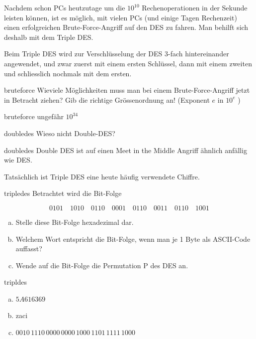 \documentclass[%
<<<<<<< Updated upstream
11pt,%
twoside,%
titlepage,%
german,%
headsepline%
]{scrartcl}
\begin{document}
\begin{cdef}[Linksverschiebung]{}
\begin{cdef}{}
\begin{ueb}
\begin{enumeratea}
Nachdem schon PCs heutzutage um die $10^{10}$ Rechenoperationen in der Sekunde leisten k\"onnen, ist es möglich, mit vielen PCs (und einige Tagen Rechenzeit) einen erfolgreichen Brute-Force-Angriff auf den DES zu fahren. Man behilft sich deshalb mit dem Triple DES.

Beim Triple DES wird zur Verschlüsselung der DES 3-fach hintereinander angewendet, und zwar zuerst mit einem ersten Schlüssel, dann mit einem zweiten und schliesslich nochmals mit dem ersten.

\begin{uebenv}{bruteforce}
Wieviele Möglichkeiten muss man bei einem Brute-Force-Angriff jetzt in Betracht ziehen? 
Gib die richtige Gr\"ossenordnung an! (Exponent $e$ in $10^e$ )
\end{uebenv}

\begin{lsg}{bruteforce}
    ungefähr $10^{34}$
\end{lsg}

\begin{uebenv}{doubledes}
Wieso nicht Double-DES?
\end{uebenv}

\begin{lsg}{doubledes}
    Double DES ist auf einen Meet in the Middle Angriff ähnlich anfällig wie DES.
\end{lsg}

Tatsächlich ist Triple DES eine heute häufig verwendete Chiffre.

\begin{uebenv}{tripledes}
Betrachtet wird die Bit-Folge

$$0101\quad 1010\quad 0110\quad 0001\quad 0110\quad 0011\quad 0110\quad 1001$$

\begin{enumerate}[a)]
\item Stelle diese Bit-Folge hexadezimal dar. 
\item Welchem Wort entspricht die Bit-Folge, wenn man je 1 Byte als ASCII-Code auffasst? 
\item Wende auf die Bit-Folge die  Permutation P des DES an.
\end{enumerate}
\end{uebenv}

\begin{lsg}{tripldes}
    \begin{enumerate}[a)]
        \item $5A616369$
        \item zaci
        \item $0010\,1110\,0000\,0000\,1000\,1101\,1111\,1000$
    \end{enumerate}
\end{lsg}


\end{enumeratea}
\end{ueb}
\end{cdef}
\end{cdef}
\end{document}
